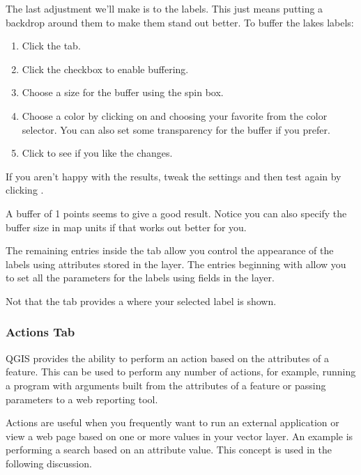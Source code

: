 The last adjustment we'll make is to  the labels. This just means
putting a backdrop around them to make them stand out better. To buffer the
lakes labels:

\begin{enumerate}
\item Click the  tab.
\item Click the  checkbox to enable buffering.
\item Choose a size for the buffer using the spin box.
\item Choose a color by clicking on  and choosing your
  favorite from the color selector. You can also set some transparency for the
  buffer if you prefer.
\item Click  to see if you like the changes.
\end{enumerate} 

If you aren't happy with the results, tweak the settings and then test again
by clicking .

A buffer of 1 points seems to give a good result.
Notice you can also specify the buffer size in map units if that works out
better for you.

The remaining entries inside the  tab allow you control the appearance of the
labels using attributes stored in the layer. The entries beginning with  allow you to
set all the parameters for the labels using fields in the layer.

Not that the  tab provides a  where your
selected label is shown.

\subsubsection{Actions Tab}\label{label_actions}

QGIS provides the ability to perform an action based on the attributes of a
feature. This can be used to perform any number of actions, for example,
running a program with arguments built from the attributes of a feature or
passing parameters to a web reporting tool.

Actions are useful when you frequently want to run an external application or
view a web page based on one or more values in your vector layer. An example
is performing a search based on an attribute value. This concept is used in 
the following discussion.


